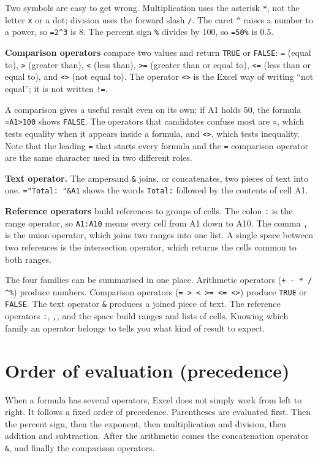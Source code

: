 \documentclass[11pt]{article}
\begin{document}
Two symbols are easy to get wrong. Multiplication uses the asterisk
\texttt{*}, not the letter \texttt{x} or a dot; division uses the forward
slash \texttt{/}. The caret \texttt{\textasciicircum} raises a number to a
power, so \texttt{=2\textasciicircum3} is 8. The percent sign \texttt{\%}
divides by 100, so \texttt{=50\%} is 0.5.

\textbf{Comparison operators} compare two values and return \texttt{TRUE} or
\texttt{FALSE}: \texttt{=} (equal to), \texttt{>} (greater than), \texttt{<}
(less than), \texttt{>=} (greater than or equal to), \texttt{<=} (less than or
equal to), and \texttt{<>} (not equal to). The operator \texttt{<>} is the
Excel way of writing ``not equal''; it is not written \texttt{!=}.

A comparison gives a useful result even on its own: if A1 holds 50, the
formula \texttt{=A1>100} shows \texttt{FALSE}. The operators that candidates
confuse most are \texttt{=}, which tests equality when it appears inside a
formula, and \texttt{<>}, which tests inequality. Note that the leading
\texttt{=} that starts every formula and the \texttt{=} comparison operator
are the same character used in two different roles.

\textbf{Text operator.} The ampersand \texttt{\&} joins, or concatenates, two
pieces of text into one. \texttt{="Total: "\&A1} shows the words
\texttt{Total:} followed by the contents of cell A1.

\textbf{Reference operators} build references to groups of cells. The colon
\texttt{:} is the range operator, so \texttt{A1:A10} means every cell from A1
down to A10. The comma \texttt{,} is the union operator, which joins two
ranges into one list. A single space between two references is the
intersection operator, which returns the cells common to both ranges.

The four families can be summarised in one place. Arithmetic operators
(\texttt{+ - * / \textasciicircum \%}) produce numbers. Comparison operators
(\texttt{= > < >= <= <>}) produce \texttt{TRUE} or \texttt{FALSE}. The text
operator \texttt{\&} produces a joined piece of text. The reference operators
\texttt{:}, \texttt{,}, and the space build ranges and lists of cells.
Knowing which family an operator belongs to tells you what kind of result to
expect.

\section{Order of evaluation (precedence)}
When a formula has several operators, Excel does not simply work from left to
right. It follows a fixed order of precedence. Parentheses are evaluated
first. Then the percent sign, then the exponent, then multiplication and
division, then addition and subtraction. After the arithmetic comes the
concatenation operator \texttt{\&}, and finally the comparison operators.
\end{document}
